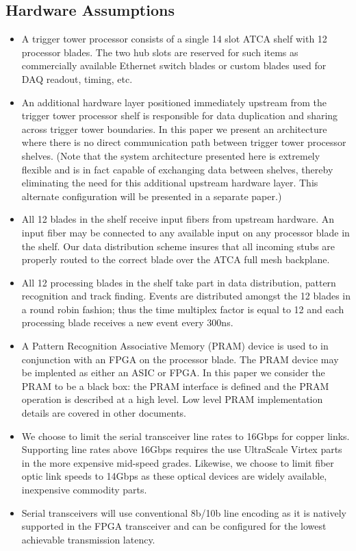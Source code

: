 \documentclass[letterpaper]{article}
\begin{document}
\subsection{Hardware Assumptions}

\begin{itemize}

\item A trigger tower processor consists of a single 14 slot ATCA shelf with 12 processor blades. The two hub slots are reserved for such items as commercially available Ethernet switch blades or custom blades used for DAQ readout, timing, etc.

\item An additional hardware layer positioned immediately upstream from the trigger tower processor shelf is responsible for data duplication and sharing across trigger tower boundaries. In this paper we present an architecture where there is no direct communication path between trigger tower processor shelves. (Note that the system architecture presented here is extremely flexible and is in fact capable of exchanging data between shelves, thereby eliminating the need for this additional upstream hardware layer. This alternate configuration will be presented in a separate paper.)

\item All 12 blades in the shelf receive input fibers from upstream hardware. An input fiber may be connected to any available input on any processor blade in the shelf. Our data distribution scheme insures that all incoming stubs are properly routed to the correct blade over the ATCA full mesh backplane.

\item All 12 processing blades in the shelf take part in data distribution, pattern recognition and track finding. Events are distributed amongst the 12 blades in a round robin fashion; thus the time multiplex factor is equal to 12 and each processing blade receives a new event every 300ns.

\item A Pattern Recognition Associative Memory (PRAM) device is used to in conjunction with an FPGA on the processor blade. The PRAM device may be implented as either an ASIC or FPGA. In this paper we consider the PRAM to be a black box: the PRAM interface is defined and the PRAM operation is described at a high level. Low level PRAM implementation details are covered in other documents.  

\item We choose to limit the serial transceiver line rates to 16Gbps for copper links. Supporting line rates above 16Gbps requires the use UltraScale Virtex parts in the more expensive mid-speed grades.  Likewise, we choose to limit fiber optic link speeds to 14Gbps as these optical devices are widely available, inexpensive commodity parts.

\item Serial transceivers will use conventional 8b/10b line encoding as it is natively supported in the FPGA transceiver and can be configured for the lowest achievable transmission latency.

\end{itemize}
\end{document}
